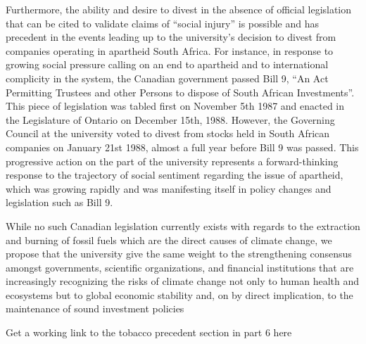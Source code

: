 Furthermore, the ability and desire to divest in the absence of official legislation that can be cited to validate claims of ``social injury'' is possible and has precedent in the events leading up to the university's decision to divest from companies operating in apartheid South Africa. 
For instance, in response to growing social pressure calling on an end to apartheid and to international complicity in the system, the Canadian government passed Bill 9, ``An Act Permitting Trustees and other Persons to dispose of South African Investments''.
This piece of legislation was tabled first on November 5th 1987 and enacted in the Legislature of Ontario on December 15th, 1988. 
However, the Governing Council at the university voted to divest from stocks held in South African companies on January 21st 1988, almost a full year before Bill 9 was passed. 
This progressive action on the part of the university represents a forward-thinking response to the trajectory of social sentiment regarding the issue of apartheid, which was growing rapidly and was manifesting itself in policy changes and legislation such as Bill 9. 

While no such Canadian legislation currently exists with regards to the extraction and burning of fossil fuels which are the direct causes of climate change, we propose that the university give the same weight to the strengthening consensus amongst governments, scientific organizations, and financial institutions that are increasingly recognizing the risks of climate change not only to human health and ecosystems but to global economic stability and, on by direct implication, to the maintenance of sound investment policies



\begin{vcom}
	Get a working link to the tobacco precedent section in part 6 here
\end{vcom}








